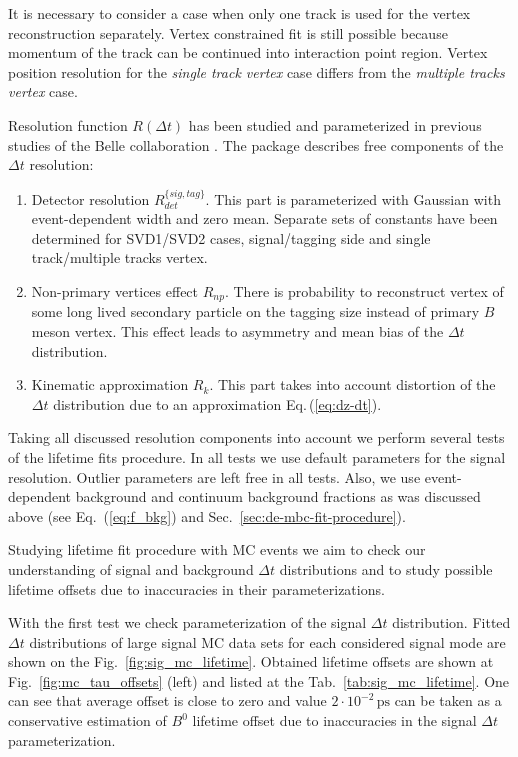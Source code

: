 \documentclass[preprint,aps,showpacs]{revtex4}
\newcommand{\dt}{\ensuremath{\Delta t}\xspace}
\begin{document}
It is necessary to consider a case when only one track is used for the vertex reconstruction separately. Vertex constrained fit is still possible because momentum of the track can be continued into interaction point region. Vertex position resolution for the {\it single track vertex} case differs from the {\it multiple tracks vertex} case.


Resolution function $R(\dt)$ has been studied and parameterized in previous studies of the Belle collaboration \cite{vertexres}. The \verb@TATAMI@ package describes free components of the \dt resolution:
\begin{enumerate}
 \item Detector resolution $R_{det}^{\{sig,tag\}}$. This part is parameterized with Gaussian with event-dependent width and zero mean. Separate sets of constants have been determined for SVD1/SVD2 cases, signal/tagging side and single track/multiple tracks vertex.
 \item Non-primary vertices effect $R_{np}$. There is probability to reconstruct vertex of some long lived secondary particle on the tagging size instead of primary $B$ meson vertex. This effect leads to asymmetry and mean bias of the \dt distribution.
 \item Kinematic approximation $R_k$. This part takes into account distortion of the \dt distribution due to an approximation Eq.\,(\ref{eq:dz-dt}).
\end{enumerate}

Taking all discussed resolution components into account we perform several tests of the lifetime fits procedure. In all tests we use default \verb@TATAMI@ parameters for the signal resolution. Outlier parameters are left free in all tests. Also, we use event-dependent background and continuum background fractions as was discussed above (see Eq.~(\ref{eq:f_bkg}) and Sec.~\ref{sec:de-mbc-fit-procedure}).

Studying lifetime fit procedure with MC events we aim to check our understanding of signal and background \dt distributions and to study possible lifetime offsets due to inaccuracies in their parameterizations.

With the first test we check parameterization of the signal \dt distribution. Fitted \dt distributions of large signal MC data sets for each considered signal mode are shown on the Fig.~\ref{fig:sig_mc_lifetime}.
Obtained lifetime offsets are shown at Fig.~\ref{fig:mc_tau_offsets} (left) and listed at the Tab.~\ref{tab:sig_mc_lifetime}.
One can see that average offset is close to zero and value $2\cdot10^{-2}\,\text{ps}$ can be taken as a conservative estimation of $B^0$ lifetime offset due to inaccuracies in the signal \dt parameterization.
\end{document}
